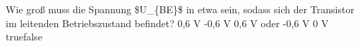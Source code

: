    {Wie groß muss die Spannung \$U\_\{BE\}\$ in etwa sein, sodass sich der Transistor im leitenden Betriebszustand befindet?}
    {0,6 V}
    {-0,6 V}
    {0,6 V oder -0,6 V}
    {0 V}
    {true}{false}